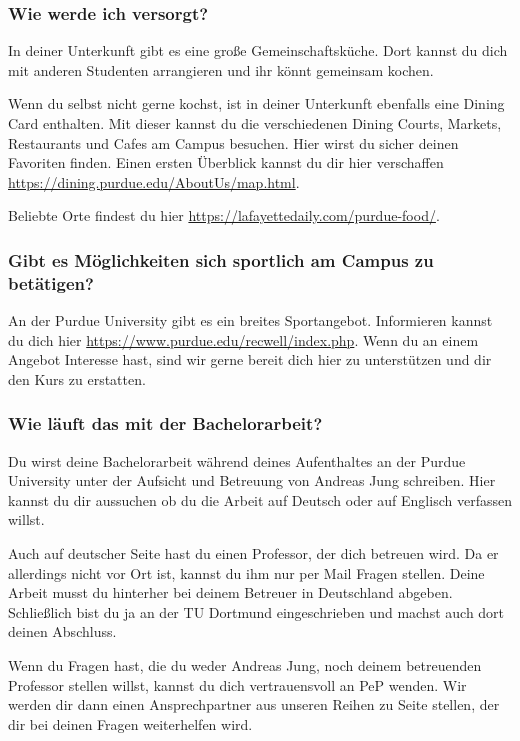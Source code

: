 \documentclass[
  paper=a4,
  fontsize=12pt,
  DIV=16,
  headheight=52pt,
  footheight=45pt,
  headinclude,
  parskip=full,
]{scrartcl}
\begin{document}
\subsubsection*{Wie werde ich versorgt?}
In deiner Unterkunft gibt es eine große Gemeinschaftsküche.
Dort kannst du dich mit anderen Studenten arrangieren und ihr könnt gemeinsam
kochen.

Wenn du selbst nicht gerne kochst, ist in deiner Unterkunft ebenfalls eine
Dining Card enthalten. Mit dieser kannst du die verschiedenen Dining Courts,
Markets, Restaurants und Cafes am Campus besuchen.
Hier wirst du sicher deinen Favoriten finden.
Einen ersten Überblick kannst du dir hier verschaffen
\url{https://dining.purdue.edu/AboutUs/map.html}.

Beliebte Orte findest du hier \url{https://lafayettedaily.com/purdue-food/}.

\subsubsection*{Gibt es Möglichkeiten sich sportlich am Campus zu betätigen?}
An der Purdue University gibt es ein breites Sportangebot.
Informieren kannst du dich hier \url{https://www.purdue.edu/recwell/index.php}.
Wenn du an einem Angebot Interesse hast, sind wir gerne bereit dich hier zu
unterstützen und dir den Kurs zu erstatten.

\subsubsection*{Wie läuft das mit der Bachelorarbeit?}
Du wirst deine Bachelorarbeit während deines Aufenthaltes an der Purdue
University unter der Aufsicht und Betreuung von Andreas Jung schreiben.
Hier kannst du dir aussuchen ob du die Arbeit auf Deutsch oder auf Englisch
verfassen willst.

Auch auf deutscher Seite hast du einen Professor, der dich betreuen wird.
Da er allerdings nicht vor Ort ist, kannst du ihm nur per Mail Fragen stellen.
Deine Arbeit musst du hinterher bei deinem Betreuer in Deutschland abgeben.
Schließlich bist du ja an der TU Dortmund eingeschrieben und machst auch dort
deinen Abschluss.

Wenn du Fragen hast, die du weder Andreas Jung, noch deinem betreuenden Professor
stellen willst, kannst du dich vertrauensvoll an PeP wenden.
Wir werden dir dann einen Ansprechpartner aus unseren Reihen zu Seite stellen,
der dir bei deinen Fragen weiterhelfen wird.
\end{document}
